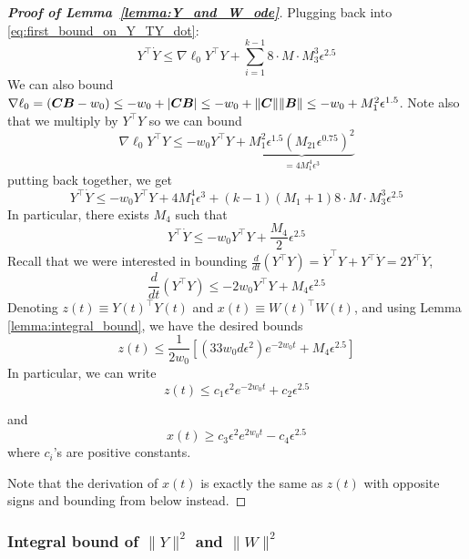\begin{proof}[\textbf{Proof of Lemma~\ref{lemma:Y_and_W_ode}}]
Plugging back into \eqref{eq:first_bound_on_Y_TY_dot}:
\begin{equation}
Y^\top\dot{Y} \le \nabla\ell_0 Y^\top Y +\sum_{i=1}^{k-1} 8\cdot M \cdot  M_3^3\epsilon^{2.5}
\end{equation}
We can also bound $\nabla\ell_0=({\bm{C}}{\bm{B}}-w_0)\le -w_0 +|{\bm{C}}{\bm{B}}|\le -w_0+\|{\bm{C}}\|\|{\bm{B}}\|\le -w_0+M_1^2\epsilon^{1.5}$. Note also that we multiply by $Y^\top Y$ so we can bound
\begin{equation}
    \nabla\ell_0Y^\top Y\le -w_0 Y^\top Y + \underbrace{M_1^2\epsilon^{1.5}(M_21\epsilon^{0.75})^2}_{=4M_1^4\epsilon^3}
\end{equation}
putting back together, we get
\begin{equation}
Y^\top\dot{Y} \le -w_0 Y^\top Y + 4M_1^4\epsilon^3 + (k-1)(M_1+1)8\cdot M \cdot  M_3^3\epsilon^{2.5}
\end{equation}
In particular, there exists $M_4$ such that 
\begin{equation}
Y^\top\dot{Y} \le -w_0 Y^\top Y + \frac{M_4}{2}\epsilon^{2.5}
\end{equation}
Recall that we were interested in bounding $\frac{d}{dt}(Y^\top Y)=\dot{Y}^\top Y + Y^\top \dot{Y}=2Y^\top\dot{Y}$,
\begin{equation}
    \frac{d}{dt}(Y^\top Y)\le -2w_0Y^\top Y+M_4\epsilon^{2.5}
\end{equation}
Denoting $z(t)\equiv Y(t)^\top Y(t)$ and $x(t)\equiv W(t)^\top W(t)$, and using Lemma \ref{lemma:integral_bound}, we have the desired bounds
\begin{equation}
    z(t)  \le \frac{1}{2w_0}\left[(33w_0 d \epsilon^2)e^{-2w_0 t} + M_4 \epsilon^{2.5} \right]
\end{equation}
In particular, we can write
\begin{equation}
    z(t)  \le c_1\epsilon^2e^{-2w_0 t} + c_2 \epsilon^{2.5}
\end{equation}

and
\begin{equation}
    x(t)  \ge c_3\epsilon^2e^{2w_0 t} - c_4 \epsilon^{2.5}
\end{equation}
where $c_i$'s are positive constants.

Note that the derivation of $x(t)$ is exactly the same as $z(t)$ with opposite signs and bounding from below instead.

\end{proof}

\subsubsection{Integral bound of $\|Y\|^2$ and $\|W\|^2$}


